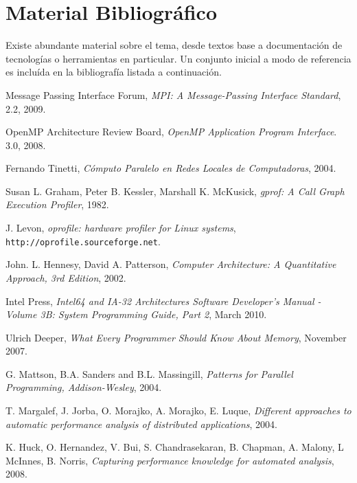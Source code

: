 \documentclass[a4paper]{article}
\begin{document}
\section{Material Bibliogr\'afico}

Existe abundante material sobre el tema, desde textos base a documentaci\'on
de tecnolog\'ias o herramientas en particular. Un conjunto inicial a modo de
referencia es inclu\'ida en la bibliograf\'ia listada a continuaci\'on.

\begin{thebibliography}{9}
  
  Message Passing Interface Forum,
  \emph{MPI: A Message-Passing Interface Standard},
  2.2,
  2009.

  OpenMP Architecture Review Board,
  \emph{OpenMP Application Program Interface}.
  3.0,
  2008.

  Fernando Tinetti,
  \emph{C\'omputo Paralelo en Redes Locales de Computadoras},
  2004.

 Susan L. Graham,  Peter B. Kessler,  Marshall K. McKusick,
 \emph{gprof: A Call Graph Execution Profiler},
 1982.

J. Levon,
\emph{oprofile: hardware profiler for Linux systems},
{\tt http://oprofile.sourceforge.net}.

 John. L. Hennesy, David A. Patterson,
 \emph{Computer Architecture: A Quantitative Approach, 3rd Edition},
 2002.

 Intel Press,
 \emph{Intel64 and IA-32 Architectures Software Developer's Manual - Volume 3B: System Programming Guide, Part 2},
 March 2010.

 Ulrich Deeper,
 \emph{What Every Programmer Should Know About Memory},
 November 2007.

 G. Mattson, B.A. Sanders and B.L. Massingill, 
 \emph{Patterns for Parallel Programming, Addison-Wesley},
 2004.

 T. Margalef, J. Jorba, O. Morajko, A. Morajko, E. Luque,
 \emph{Different approaches to automatic performance analysis of distributed applications},
 2004.

 K. Huck, O. Hernandez, V. Bui, S. Chandrasekaran, B. Chapman, A. Malony, L McInnes, B. Norris,
 \emph{Capturing performance knowledge for automated analysis},
 2008.


\end{thebibliography}
\end{document}
